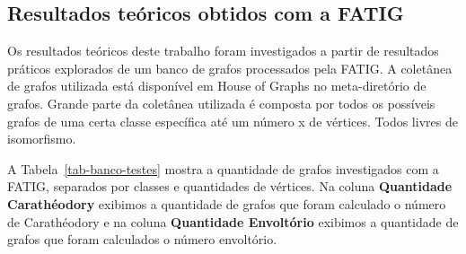 \subsection{Resultados teóricos obtidos com a FATIG}
Os resultados teóricos deste trabalho foram investigados a partir de resultados práticos explorados de um banco de grafos processados pela FATIG.
A coletânea de grafos utilizada está disponível em House of Graphs \cite{hog2013} no meta-diretório de grafos. 
Grande parte da coletânea utilizada é composta por todos os possíveis grafos de uma certa classe
específica até um número x de vértices. 
Todos livres de isomorfismo. 

A Tabela~\ref{tab-banco-testes} mostra a quantidade de grafos investigados com a FATIG, separados por classes e quantidades de vértices. Na coluna {\bf Quantidade Carathéodory} exibimos a quantidade de grafos que foram calculado o número de Carathéodory e na coluna {\bf Quantidade Envoltório} exibimos a quantidade de grafos que foram calculados o número envoltório.

